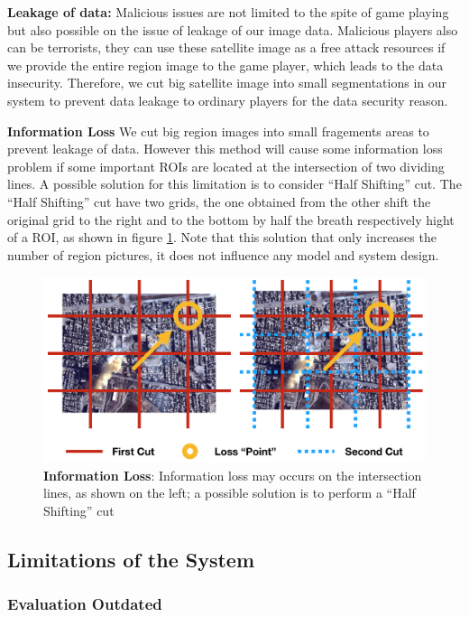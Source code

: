 \textbf{Leakage of data:} 
Malicious issues are not limited to the spite of game playing but also possible on the issue of leakage of our image data.
Malicious players also can be terrorists, they can use these satellite image as a free attack resources 
if we provide the entire region image to the game player, which leads to the data insecurity.
Therefore, we cut big satellite image into small segmentations in our system to prevent data leakage to ordinary players
for the data security reason.

\textbf{Information Loss}
We cut big region images into small fragements areas to prevent leakage of data. 
However this method will cause some information loss problem if some important ROIs are 
located at the intersection of two dividing lines.
A possible solution for this limitation is to consider ``Half Shifting'' cut. 
The ``Half Shifting'' cut have two grids, 
the one obtained from the other shift the original grid to the right and to the bottom by half the breath 
respectively hight of a ROI, as shown in figure \ref{fig:information_loss}. Note that this solution that
only increases the number of region pictures, it does not influence any model and system design.

\begin{figure}[H]
\centering
\includegraphics[width=0.7\columnwidth]{figures/information_loss3}
\caption{
    \textbf{Information Loss}: Information loss may occurs on the intersection lines, as shown on the left; 
    a possible solution is to perform a ``Half Shifting'' cut
}
\label{fig:information_loss}
\end{figure}

\subsection{Limitations of the System}

\subsubsection{Evaluation Outdated}

